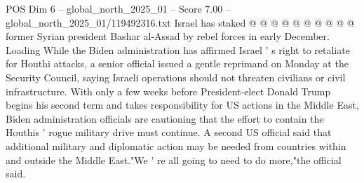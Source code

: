 \begin{textsample}{POS Dim 6 – global\_north\_2025\_01 – Score 7.00 – global\_north\_2025\_01/119492316.txt}
Israel has staked @ @ @ @ @ @ @ @ @ @ former Syrian president Bashar al-Assad by rebel forces in early December.
Loading While the Biden administration has affirmed Israel ' s right to retaliate for Houthi attacks, a senior official issued a gentle reprimand on Monday at the Security Council, saying Israeli operations should not threaten civilians or civil infrastructure.
With only a few weeks before President-elect Donald Trump begins his second term and takes responsibility for US actions in the Middle East, Biden administration officials are cautioning that the effort to contain the Houthis ' rogue military drive must continue.
A second US official said that additional military and diplomatic action may be needed from countries within and outside the Middle East."We ' re all going to need to do more,"the official said.

\end{textsample}
